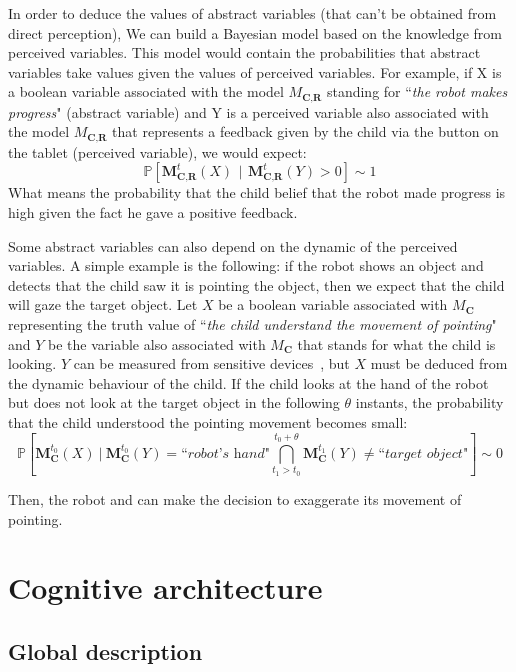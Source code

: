\documentclass[10pt,a4paper]{article}
\newcommand\given[1][]{\:#1\vert\:}
\begin{document}
In order to deduce the values of abstract variables (that can't be obtained from direct perception), We can build a Bayesian model based on the knowledge from perceived variables. This model would contain the probabilities that abstract variables take values given the values of perceived variables. For example, if X is a boolean variable associated with the model $M_{\textbf{C,R}}$ standing for ``\textit{the robot makes progress}" (abstract variable) and Y is a perceived variable also associated with the model $M_{\textbf{C,R}}$ that represents a feedback given by the child via the button on the tablet (perceived variable), we would expect:$$ \mathbb{P}\left[\textbf{M}^t_{\textbf{C,R}}(X)\,\given[\Big]\,\textbf{M}^t_{\textbf{C,R}}(Y)>0\right]\sim 1$$ What means the probability that the child belief that the robot made progress is high given the fact he gave a positive feedback.

Some abstract variables can also depend on the dynamic of the perceived variables. A simple example is the following: if the robot shows an object and detects that the child saw it is pointing the object, then we expect that the child will gaze the target object. Let $X$ be a boolean variable associated with $M_{\textbf{C}}$ representing the truth value of ``\textit{the child understand the movement of pointing}" and $Y$ be the variable also associated with $M_{\textbf{C}}$ that stands for what the child is looking. $Y$ can be measured from sensitive devices~\cite{lemaignan2016realtime}, but $X$ must be deduced from the dynamic behaviour of the child. If the child looks at the hand of the robot but does not look at the target object in the following $\theta$ instants,  the probability that the child understood the pointing movement becomes small:
$$\displaystyle \mathbb{P}\left[ \textbf{M}^{t_0}_\textbf{C}(X) \given[\Big] \textbf{M}^{t_0}_\textbf{C}(Y)=\textit{``robot's hand"} \bigcap\limits^{t_0+\theta}_{t_1>t_0} \textbf{M}^{t_1}_\textbf{C}(Y)\neq\textit{``target object"}\right]\sim 0$$

Then, the robot and can make the decision to exaggerate its movement of pointing. 


\section{Cognitive architecture}

\subsection{Global description}
\end{document}
